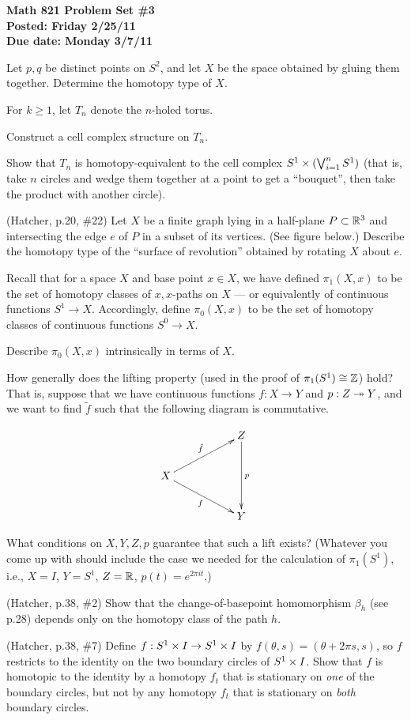 
\usepackage{youngtab}

\thispagestyle{empty}
{\bf Math 821 Problem Set \#3\\
Posted: Friday 2/25/11\\
Due date: Monday 3/7/11}

\prob Let $p,q$ be distinct points on $S^2$, and let $X$ be the space obtained by gluing
them together.  Determine the homotopy type of $X$.

\prob For $k\geq 1$, let $T_n$ denote the $n$-holed torus.

\probpart Construct a cell complex structure on $T_n$.

\probpart Show that $T_n$ is homotopy-equivalent to the cell complex
$S^1\times(\bigvee_{i=1}^n S^1)$ (that is, take $n$ circles and wedge them together
at a point to get a ``bouquet'', then take the product with another circle).


\prob (Hatcher, p.20, \#22) Let $X$ be a finite graph lying in a half-plane $P\subset\mathbb{R}^3$ and intersecting the
edge $e$ of $P$ in a subset of its vertices.  (See figure below.)  Describe the homotopy type of the ``surface of revolution''
obtained by rotating $X$ about $e$.


\prob Recall that for a space $X$ and base point $x\in X$, we have defined $\pi_1(X,x)$ to be
the set of homotopy classes of $x,x$-paths on $X$ --- or equivalently of continuous functions
$S^1\to X$.  Accordingly, define $\pi_0(X,x)$ to be the set of homotopy classes of continuous functions $S^0\to X$.

Describe $\pi_0(X,x)$ intrinsically in terms of $X$.

\pagebreak

\prob How generally does the lifting property
(used in the proof of $\pi_1(S^1)\cong\mathbb{Z}$) hold?
That is, suppose that we have continuous functions $f:X\to Y$
and $p:Z\twoheadrightarrow Y$, and we want to find $\tilde f$ such that the following diagram is
commutative.

\begin{equation*}
\xymatrix{
&& Z\ar[dd]^p\\
X\ar[urr]^{\tilde f} \ar[drr]_f\\
&& Y
}
\end{equation*}

What conditions on $X,Y,Z,p$ guarantee that such a lift exists?  (Whatever you come
up with should include the case we needed for the calculation of $\pi_1(S^1)$,
i.e., $X=I$, $Y=S^1$, $Z=\mathbb{R}$, $p(t)=e^{2\pi i t}$.)

\prob (Hatcher, p.38, \#2) Show that the change-of-basepoint homomorphism $\beta_h$ (see p.28)
depends only on the homotopy class of the path $h$.

\prob (Hatcher, p.38, \#7) Define $f:S^1\times I\to S^1\times I$ by $f(\theta,s)=(\theta+2\pi s,s)$,
so $f$ restricts to the identity on the two boundary circles of $S^1\times I$.   Show that $f$ is homotopic
to the identity by a homotopy $f_t$ that is stationary on \emph{one} of the boundary circles, but not
by any homotopy $f_t$ that is stationary on \emph{both} boundary circles.



